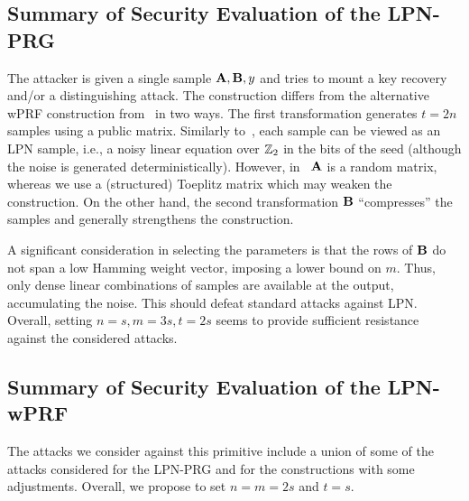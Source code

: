 \subsection{Summary of Security Evaluation of the LPN-PRG}
The attacker is given a single sample $\mat{A},\mat{B},y$ and tries to mount a key recovery and/or a distinguishing attack. The construction differs from the alternative wPRF construction from~\cite{boneh2018-darkmatter} in two ways. The first transformation generates $t = 2n$ samples using a public matrix. Similarly to~\cite{boneh2018-darkmatter}, each sample can be viewed as an LPN sample, i.e., a noisy linear equation over $\mathbb{Z}_2$ in the bits of the seed (although the noise is generated deterministically). However, in~\cite{boneh2018-darkmatter} $\mat{A}$ is a random matrix, whereas we use a (structured) Toeplitz matrix which may weaken the construction. On the other hand, the second transformation $\mat{B}$ ``compresses'' the samples and generally strengthens the construction.

A significant consideration in selecting the parameters is that the rows of $\mat{B}$ do not span a low Hamming weight vector, imposing a lower bound on $m$. Thus, only dense linear combinations of samples are available at the output, accumulating the noise. This should defeat standard attacks against LPN. Overall, setting $n=s, m = 3s, t = 2s$ seems to provide sufficient resistance against the considered attacks.

\subsection{Summary of Security Evaluation of the LPN-wPRF}
The attacks we consider against this primitive include a union of some of the attacks considered for the LPN-PRG and for the \ttwPRF constructions with some adjustments. Overall, we propose to set $n=m= 2s$ and $t =s$.
